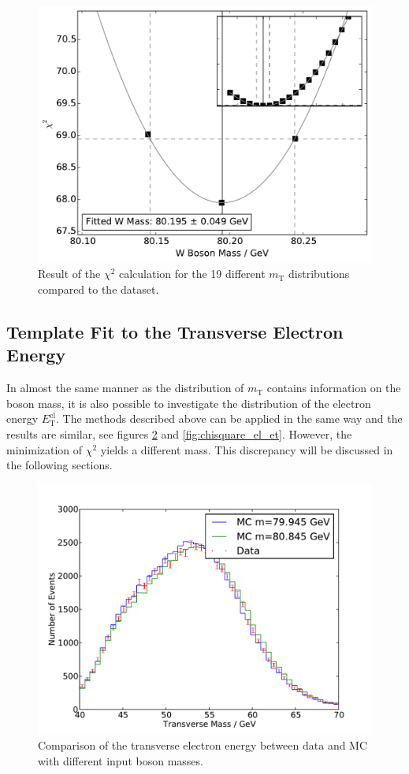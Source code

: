 \documentclass[
	paper=A4,
	parskip=full,
	chapterprefix=true,
	11pt,
	headings=normal,
	bibliography=totoc,
	listof=totoc,
	titlepage=on,
]{scrreprt}
\newcommand{\ELET}{\ensuremath{{E_\mathrm{T}^\mathrm{el}}}\xspace}
\newcommand{\MT}{\ensuremath{{m_\mathrm{T}}}\xspace}
\begin{document}
\begin{figure}
	\centering
	\includegraphics{chisquare_m_t}
	\caption{Result of the $\chi^2$ calculation for the 19 different \MT distributions compared to the dataset.}
	\label{fig:chisquare_m_t}
\end{figure}


\subsection{Template Fit to the Transverse Electron Energy}
In almost the same manner as the distribution of \MT contains information on the \PW boson mass, it is also possible to investigate the distribution of the electron energy \ELET. The methods described above can be applied in the same way and the results are similar, see figures \ref{fig:comparison_el_et} and \ref{fig:chisquare_el_et}. However, the minimization of $\chi^2$ yields a different \PW mass. This discrepancy will be discussed in the following sections.

\begin{figure}
	\centering
	\includegraphics{comparison_m_t}
	\caption{Comparison of the transverse electron energy between data and MC with different input \PW boson masses.}
	\label{fig:comparison_el_et}
\end{figure}
\end{document}
